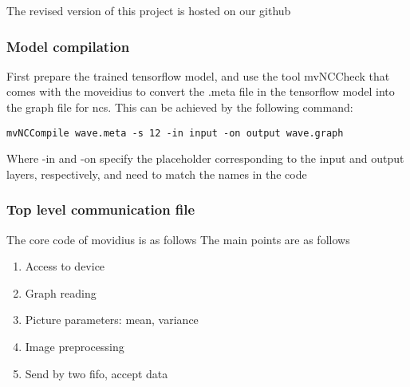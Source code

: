 The revised version of this project is hosted on our github\cite{my-nerual-style-tensorflow}
\subsubsection{Model compilation}
First prepare the trained tensorflow model, and use the tool mvNCCheck that comes with the moveidius to convert the .meta file in the tensorflow model into the graph file for ncs.
This can be achieved by the following command:
\begin{lstlisting}
mvNCCompile wave.meta -s 12 -in input -on output wave.graph
\end{lstlisting}
Where -in and -on specify the placeholder corresponding to the input and output layers, respectively, and need to match the names in the code
\subsubsection{Top level communication file}
The core code of movidius is as follows
The main points are as follows
\begin{enumerate}
  \item Access to device
  \item Graph reading
  \item Picture parameters: mean, variance
  \item Image preprocessing
  \item Send by two fifo, accept data
\end{enumerate}
